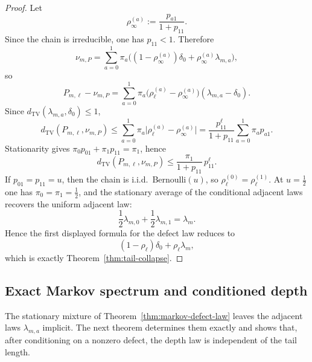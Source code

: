 \documentclass[11pt,reqno]{amsart}
\numberwithin{equation}{section}
\theoremstyle{plain}
\theoremstyle{definition}
\theoremstyle{remark}
\begin{document}
\begin{proof}
Let
\[
\rho_\infty^{(a)}:=\frac{p_{a1}}{1+p_{11}}.
\]
Since the chain is irreducible, one has $p_{11}<1$.  Therefore
\[
\nu_{m,P}
=
\sum_{a=0}^1
\pi_a\bigl((1-\rho_\infty^{(a)})\delta_0+\rho_\infty^{(a)}\lambda_{m,a}\bigr),
\]
so
\[
P_{m,\ell}-\nu_{m,P}
=
\sum_{a=0}^1
\pi_a\bigl(\rho_\ell^{(a)}-\rho_\infty^{(a)}\bigr)(\lambda_{m,a}-\delta_0).
\]
Since $d_{\mathrm{TV}}(\lambda_{m,a},\delta_0)\le 1$,
\[
d_{\mathrm{TV}}(P_{m,\ell},\nu_{m,P})
\le
\sum_{a=0}^1 \pi_a\bigl|\rho_\ell^{(a)}-\rho_\infty^{(a)}\bigr|
=
\frac{p_{11}^{\ell}}{1+p_{11}}
\sum_{a=0}^1 \pi_a p_{a1}.
\]
Stationarity gives $\pi_0p_{01}+\pi_1p_{11}=\pi_1$, hence
\[
d_{\mathrm{TV}}(P_{m,\ell},\nu_{m,P})
\le
\frac{\pi_1}{1+p_{11}}\,p_{11}^{\ell}.
\]
If $p_{01}=p_{11}=u$, then the chain is i.i.d.\ Bernoulli$(u)$, so
$\rho_\ell^{(0)}=\rho_\ell^{(1)}$.  At $u=\frac12$ one has
$\pi_0=\pi_1=\frac12$, and the stationary average of the conditional adjacent
laws recovers the uniform adjacent law:
\[
\frac12\lambda_{m,0}+\frac12\lambda_{m,1}=\lambda_m.
\]
Hence the first displayed formula for the defect law reduces to
\[
(1-\rho_\ell)\delta_0+\rho_\ell\lambda_m,
\]
which is exactly Theorem~\ref{thm:tail-collapse}.
\end{proof}

\subsection{Exact Markov spectrum and conditioned depth}

The stationary mixture of Theorem~\ref{thm:markov-defect-law} leaves the
adjacent laws $\lambda_{m,a}$ implicit.  The next theorem determines them
exactly and shows that, after conditioning on a nonzero defect, the depth law
is independent of the tail length.
\end{document}
